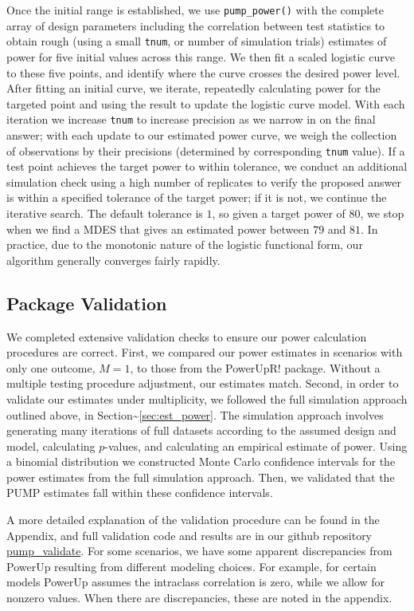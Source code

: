 \documentclass[
]{article}
\begin{document}
Once the initial range is established, we use \texttt{pump\_power()}
with the complete array of design parameters including the correlation
between test statistics to obtain rough (using a small \texttt{tnum}, or
number of simulation trials) estimates of power for five initial values
across this range. We then fit a scaled logistic curve to these five
points, and identify where the curve crosses the desired power level.
After fitting an initial curve, we iterate, repeatedly calculating power
for the targeted point and using the result to update the logistic curve
model. With each iteration we increase \texttt{tnum} to increase
precision as we narrow in on the final answer; with each update to our
estimated power curve, we weigh the collection of observations by their
precisions (determined by corresponding \texttt{tnum} value). If a test
point achieves the target power to within tolerance, we conduct an
additional simulation check using a high number of replicates to verify
the proposed answer is within a specified tolerance of the target power;
if it is not, we continue the iterative search. The default tolerance is
\(1%
\), so given a target power of \(80%
\), we stop when we find a MDES that gives an estimated power between
\(79%
\) and \(81%
\). In practice, due to the monotonic nature of the logistic functional
form, our algorithm generally converges fairly rapidly.

\subsection{Package Validation}

We completed extensive validation checks to ensure our power calculation
procedures are correct. First, we compared our power estimates in
scenarios with only one outcome, \(M = 1\), to those from the PowerUpR!
package. Without a multiple testing procedure adjustment, our estimates
match. Second, in order to validate our estimates under multiplicity, we
followed the full simulation approach outlined above, in
Section\textasciitilde{}\ref{sec:est_power}. The simulation approach
involves generating many iterations of full datasets according to the
assumed design and model, calculating \(p\)-values, and calculating an
empirical estimate of power. Using a binomial distribution we
constructed Monte Carlo confidence intervals for the power estimates
from the full simulation approach. Then, we validated that the PUMP
estimates fall within these confidence intervals.

A more detailed explanation of the validation procedure can be found in
the Appendix, and full validation code and results are in our github
repository
\href{https://github.com/MDRCNY/pump_validate}{pump\_validate}. For some
scenarios, we have some apparent discrepancies from PowerUp resulting
from different modeling choices. For example, for certain models PowerUp
assumes the intraclass correlation is zero, while we allow for nonzero
values. When there are discrepancies, these are noted in the appendix.
\end{document}
